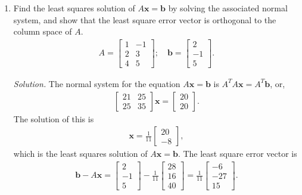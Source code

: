 \documentclass{article}
\begin{document}
\begin{enumerate}
\item
Find the least squares solution of $A\mathbf{x}=\mathbf{b}$ by solving the associated normal system,
and show that the least square error vector is orthogonal to the column space of $A$.
	\begin{align*}
	A=\left[ \begin{array}{ll} 1&-1 \\ 2&3 \\ 4&5 \end{array}\right]; \quad\mathbf{b}=\left[\begin{array}{l} 2\\-1\\5\end{array}\right].	
	\end{align*}
	
\emph{Solution.}
The normal system for the equation $A\mathbf{x}=\mathbf{b}$ is $A^TA\mathbf{x}=A^T\mathbf{b}$, or,
	\begin{align*}
	\left[\begin{array}{ll} 21&25\\ 25&35\end{array}\right]\mathbf{x}=\left[\begin{array}{l} 20\\20\end{array}\right].
	\end{align*}
The solution of this is
	\begin{align*}
	\mathbf{x}=\frac{1}{11}\left[\begin{array}{l} 20 \\ -8\end{array}\right],	
	\end{align*}
which is the least squares solution of $A\mathbf{x}=\mathbf{b}$.
The least square error vector is
	\begin{align*}
	\mathbf{b}-A\mathbf{x}=	\left[\begin{array}{l} 2\\-1\\5\end{array}\right]-\frac{1}{11}\left[\begin{array}{l} 28\\16\\40\end{array}\right]
	=\frac{1}{11}\left[\begin{array}{l} -6\\-27\\15\end{array}\right].
	\end{align*}

\end{enumerate}
\end{document}
